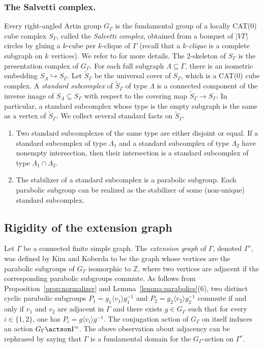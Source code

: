 \subsubsection*{The Salvetti complex.} Every right-angled Artin group $G_\Gamma$ is the fundamental group of a locally CAT(0) cube complex $S_\Gamma$, called the \emph{Salvetti complex}, obtained from a bouquet of $|V\Gamma|$ circles by gluing a $k$-cube per $k$-clique of $\Gamma$ (recall that a \emph{$k$-clique} is a complete subgraph on $k$ vertices). We refer to \cite[\S 3.6]{charney2007introduction} for more details. The 2-skeleton of $S_\Gamma$ is the presentation complex of $G_\Gamma$. For each full subgraph $\Lambda\subseteq \Gamma$, there is an isometric embedding $S_{\Lambda}\hookrightarrow S_\Gamma$. Let $\widetilde{S}_\Gamma$ be the universal cover of $S_\Gamma$, which is a CAT(0) cube complex. A \emph{standard subcomplex} of $\widetilde{S}_\Gamma$ of type $\Lambda$ is a connected component of the inverse image of $S_{\Lambda}\subseteq S_\Gamma$ with respect to the covering map $\widetilde{S}_\Gamma\to S_\Gamma$. In particular, a standard subcomplex whose type is the empty subgraph is the same as a vertex of $\widetilde{S}_\Gamma$. We collect several standard facts on $\widetilde{S}_\Gamma$.
\begin{enumerate}
\item Two standard subcomplexes of the same type are either disjoint or equal. If a standard subcomplex of type $\Lambda_1$ and a standard subcomplex of type $\Lambda_2$ have nonempty intersection, then their intersection is a standard subcomplex of type $\Lambda_1\cap\Lambda_2$.
\item The stabilizer of a standard subcomplex is a parabolic subgroup. Each parabolic subgroup can be realized as the stabilizer of some (non-unique) standard subcomplex.
\end{enumerate}

\subsection{Rigidity of the extension graph}\label{sec:rigidity}

Let $\Gamma$ be a connected finite simple graph. The \emph{extension graph} of $\Gamma$, denoted $\Gamma^e$, was defined by Kim and Koberda \cite{kim2013embedability} to be the graph whose vertices are the parabolic subgroups of $G_\Gamma$ isomorphic to $\mathbb Z$, where two vertices are adjacent if the corresponding parabolic subgroups commute. As follows from Proposition~\ref{prop:normalizer} and Lemma~\ref{lemma:parabolics}(6), two distinct cyclic parabolic subgroups $P_1=g_1\langle v_1\rangle g_1^{-1}$ and $P_2=g_2\langle v_2\rangle g_2^{-1}$ commute if and only if $v_1$ and $v_2$ are adjacent in $\Gamma$ and there exists $g\in G_\Gamma$ such that for every $i\in\{1,2\}$, one has $P_i=g\langle v_i\rangle g^{-1}$. The conjugation action of $G_\Gamma$ on itself induces an action $G_\Gamma\actson \Gamma^e$. The above observation about adjacency can be rephrased by saying that $\Gamma$ is a fundamental domain for the $G_\Gamma$-action on $\Gamma^e$.

